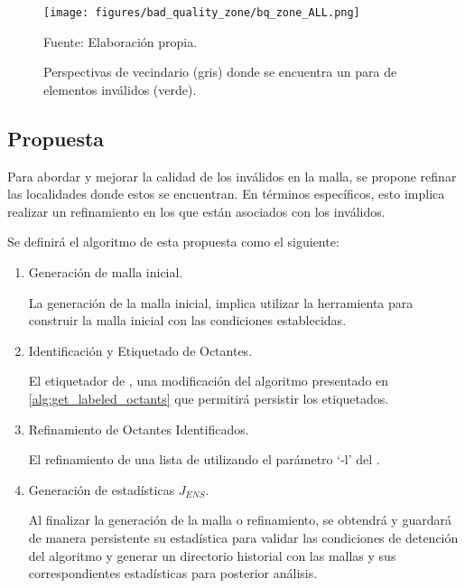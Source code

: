\begin{figure}[!ht]
    \centering
    \texttt{[image: figures/bad\_quality\_zone/bq\_zone\_ALL.png]}
    \caption{ Perspectivas de vecindario (gris) donde se encuentra un para de elementos inválidos (verde). }
    Fuente: Elaboración propia.
    \label{fig:zoom_cortex_surf_all}
\end{figure}


\subsection{Propuesta}

Para abordar y mejorar la calidad de los \elements{} inválidos en la malla, se propone refinar las localidades donde estos se encuentran. En términos específicos, esto implica realizar un refinamiento en los \octants{} que están asociados con los \elements{} inválidos.




Se definirá el algoritmo de esta propuesta como el siguiente:

\begin{enumerate}
    \item Generación de malla inicial.
    
        La generación de la malla inicial, implica utilizar la herramienta \mesher{} para construir la malla inicial con las condiciones establecidas.
    \item Identificación y Etiquetado de Octantes.
        
        El etiquetador de \octants{}, una modificación del algoritmo presentado en \autoref{alg:get_labeled_octants} que permitirá persistir los \octants{} etiquetados.
    
    \item Refinamiento de Octantes Identificados.
        
        El refinamiento de una lista de \octants{} utilizando el parámetro `-l' del \mesher{}.
            
    \item Generación de estadísticas $J_{ENS}$.
    
   	 	Al finalizar la generación de la malla o refinamiento, se obtendrá y guardará de manera persistente su estadística para validar las condiciones de detención del algoritmo y generar un directorio historial con las mallas y sus correspondientes estadísticas para posterior análisis.
\end{enumerate}


